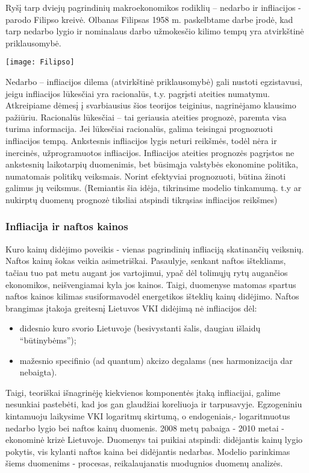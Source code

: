 \documentclass[a4paper]{article}
\begin{document}
Ryšį tarp dviejų pagrindinių makroekonomikos rodiklių – nedarbo ir infliacijos -  parodo Filipso kreivė. Olbanas Filipsas 1958 m. paskelbtame darbe įrodė, kad tarp nedarbo lygio ir nominalaus darbo užmokesčio kilimo tempų yra atvirkštinė priklausomybė.\\
\begin{center} \texttt{[image: Filipso]} \end{center}
Nedarbo – infliacijos dilema (atvirkštinė priklausomybė) gali nustoti egzistavusi, jeigu infliacijos lūkesčiai yra racionalūs, t.y. pagrįsti ateities numatymu. Atkreipiame dėmesį į svarbiausius šios teorijos teiginius, nagrinėjamo klausimo pažiūriu. Racionalūs lūkesčiai – tai geriausia ateities prognozė, paremta visa turima informacija. Jei lūkesčiai racionalūs, galima teisingai prognozuoti infliacijos tempą. Ankstesnis infliacijos lygis neturi reikšmės, todėl nėra ir inercinės, užprogramuotos infliacijos. Infliacijos ateities prognozės pagrįstos ne ankstesnių laikotarpių duomenimis, bet būsimąja valstybės ekonomine politika, numatomais politikų veiksmais. Norint efektyviai prognozuoti, būtina žinoti galimus jų veiksmus. (Remiantis šia idėja, tikrinsime modelio tinkamumą. t.y ar nukirptų duomenų prognozė tiksliai atspindi tikrąsias infliacijos reikšmes)

\newpage \subsubsection{Infliacija ir naftos kainos}
Kuro kainų didėjimo poveikis - vienas pagrindinių infliaciją skatinančių veiksnių. Naftos kainų šokas veikia asimetriškai. Pasaulyje, senkant naftos ištekliams, tačiau tuo pat metu augant jos vartojimui, ypač dėl tolimųjų rytų augančios ekonomikos, neišvengiamai kyla jos kainos. Taigi, duomenyse matomas spartus naftos kainos kilimas susiformavodėl energetikos išteklių kainų didėjimo.  Naftos brangimas įtakoja greitesnį Lietuvos VKI didėjimą nė infliacijos dėl:

\begin{itemize}
\item didesnio kuro svorio Lietuvoje (besivystanti šalis, daugiau išlaidų “būtinybėms”);
\item mažesnio specifinio (ad quantum) akcizo degalams (nes harmonizacija dar nebaigta).
\end{itemize}


Taigi, teoriškai išnagrinėję kiekvienos komponentės įtaką infliacijai, galime nesunkiai pastebėti, kad  jos gan glaudžiai koreliuoja ir tarpusavyje. Egzogeniniu kintamuoju laikysime VKI logaritmų skirtumą, o endogeniais,- logaritmuotus nedarbo lygio bei naftos kainų duomenis. 2008 metų  pabaiga - 2010 metai - ekonominė krizė Lietuvoje. Duomenys tai puikiai atspindi: didėjantis kainų lygio pokytis, vis kylanti naftos kaina bei didėjantis nedarbas. Modelio parinkimas šiems duomenims - procesas, reikalaujanatis nuodugnios duomenų analizės.
\newpage
\end{document}
